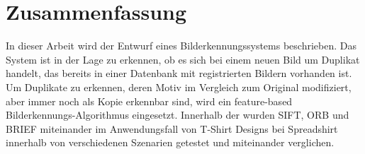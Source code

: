 
\chapter*{Zusammenfassung}
\label{sec:Zusammenfassung}
In dieser Arbeit wird der Entwurf eines Bilderkennungssystems beschrieben. 
Das System ist in der Lage  zu erkennen, ob es sich bei einem neuen Bild um Duplikat handelt, das bereits in einer Datenbank mit registrierten Bildern vorhanden ist.
Um Duplikate zu erkennen, deren Motiv im Vergleich zum Original modifiziert, aber immer noch als Kopie erkennbar sind, wird ein feature-based Bilderkennungs-Algorithmus eingesetzt. 
Innerhalb der wurden SIFT, ORB und BRIEF miteinander im Anwendungsfall von T-Shirt Designs bei Spreadshirt innerhalb von verschiedenen Szenarien getestet und miteinander verglichen.
